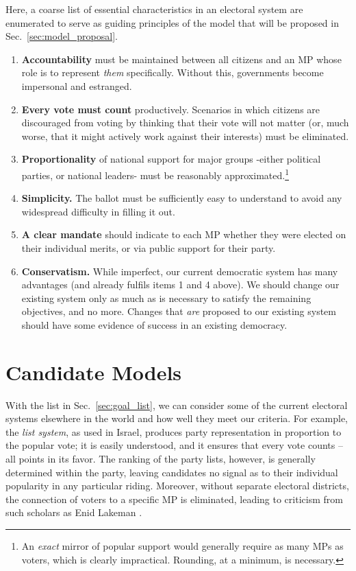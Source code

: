 \documentclass[DIV=calc, paper=a4, fontsize=11pt, twocolumn]{scrartcl}	 %
\begin{document}
Here, a coarse list of essential characteristics in an electoral system are enumerated to serve as guiding principles of the model that will be proposed in Sec.~\ref{sec:model_proposal}.  
\begin{enumerate}
\item \textbf{Accountability} must be maintained between all citizens and an MP whose role is to represent \emph{them} specifically. Without this, governments become impersonal and estranged.
\item \textbf{Every vote must count} productively. Scenarios in which citizens are discouraged from voting by thinking that their vote will not matter (or, much worse, that it might actively work against their interests) must be eliminated.
\item \textbf{Proportionality} of national support for major groups \--either political parties, or national leaders\-- must be reasonably approximated.\footnote{
An \emph{exact} mirror of popular support would generally require as many MPs as voters, which is clearly impractical. Rounding, at a minimum, is necessary.
}
\item   \textbf{Simplicity.} The ballot must be sufficiently easy to understand to avoid any widespread difficulty in filling it out. 

\item  \textbf{A clear mandate} should indicate to each MP whether they were elected on their individual merits, or via public support for their party.
\item \textbf{Conservatism.} While imperfect, our current democratic system has many advantages (and already fulfils items 1 and 4 above). We should change our existing system only as much as is necessary to satisfy the remaining objectives, and no more. Changes that \emph{are} proposed to our existing system should have some evidence of success in an existing democracy.
\end{enumerate}


\section{Candidate Models}
\label{sec:alt_models}

With the list in Sec.~\ref{sec:goal_list}, we can consider some of the current electoral systems elsewhere in the world and how well they meet our criteria. For example, the \emph{list system}, as used in Israel, produces party representation in proportion to the popular vote; it is easily understood, and it ensures that every vote counts \---all points in its favor. 
The ranking of the party lists, however, is generally determined within the party, leaving candidates no signal as to their individual popularity in any particular riding. Moreover, without separate electoral districts, the connection of voters to a specific MP is eliminated, leading to criticism from such scholars as Enid Lakeman\cite{Lakeman}
.
\end{document}
